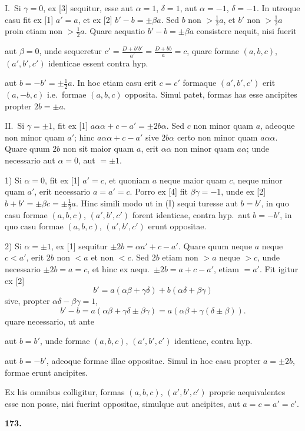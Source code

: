 \documentclass[12pt,a4paper]{article}
\theoremstyle{plain}
\theoremstyle{definition}
\theoremstyle{remark}
\begin{document}
I.\ Si $\gamma=0$, ex [3] sequitur, esse aut $\alpha=1$, $\delta=1$, aut $\alpha=-1$, $\delta=-1$. In utroque casu fit ex [1] $a'=a$, et ex [2] $b'-b=\pm\beta a$. Sed $b$ non $>\frac{1}{2}a$, et $b'$ non $>\frac{1}{2}a$ proin etiam non $>\frac{1}{2}a$. Quare aequatio $b'-b=\pm\beta a$ consistere nequit, nisi fuerit

aut $\beta=0$, unde sequeretur $c'=\frac{D+b'b'}{a'}=\frac{D+bb}{a}=c$, quare formae $(a,b,c)$, $(a',b',c')$ identicae essent contra hyp.

aut $b=-b'=\pm\frac{1}{2}a$. In hoc etiam casu erit $c=c'$ formaque $(a',b',c')$ erit $(a,-b,c)$ i.e.\ formae $(a,b,c)$ opposita. Simul patet, formas has esse ancipites propter $2b=\pm a$.

II.\ Si $\gamma=\pm 1$, fit ex [1] $a\alpha\alpha+c-a'=\pm 2b\alpha$. Sed $c$ non minor quam $a$, adeoque non minor quam $a'$; hinc $a\alpha\alpha+c-a'$ sive $2b\alpha$ certo non minor quam $a\alpha\alpha$. Quare quum $2b$ non sit maior quam $a$, erit $\alpha\alpha$ non minor quam $a\alpha$; unde necessario aut $\alpha=0$, aut $=\pm 1$.

1) Si $\alpha=0$, fit ex [1] $a'=c$, et quoniam $a$ neque maior quam $c$, neque minor quam $a'$, erit necessario $a=a'=c$. Porro ex [4] fit $\beta\gamma=-1$, unde ex [2] $b+b'=\pm\beta c=\pm\frac{1}{2}a$. Hinc simili modo ut in (I) sequi turesse aut $b=b'$, in quo casu formae $(a,b,c)$, $(a',b',c')$ forent identicae, contra hyp.\ aut $b=-b'$, in quo casu formae $(a,b,c)$, $(a',b',c')$ erunt oppositae.

2) Si $\alpha=\pm 1$, ex [1] sequitur $\pm 2b=\alpha a'+c-a'$. Quare quum neque $a$ neque $c<a'$, erit $2b$ non $<a$ et non $<c$. Sed $2b$ etiam non $>a$ neque $>c$, unde necessario $\pm 2b=a=c$, et hinc ex aequ.\ $\pm 2b=a+c-a'$, etiam $=a'$. Fit igitur ex [2]
\[b'=a(\alpha\beta+\gamma\delta)+b(\alpha\delta+\beta\gamma)\]
sive, propter $\alpha\delta-\beta\gamma=1$,
\[b'-b=a(\alpha\beta+\gamma\delta\pm\beta\gamma)=a(\alpha\beta+\gamma(\delta\pm\beta)).\]
quare necessario, ut ante

aut $b=b'$, unde formae $(a,b,c)$, $(a',b',c')$ identicae, contra hyp.

aut $b=-b'$, adeoque formae illae oppositae. Simul in hoc casu propter $a=\pm 2b$, formae erunt ancipites.

Ex his omnibus colligitur, formas $(a,b,c)$, $(a',b',c')$ proprie aequivalentes esse non posse, nisi fuerint oppositae, simulque aut ancipites, aut $a=c=a'=c'$.

\textbf{173.}
\end{document}

